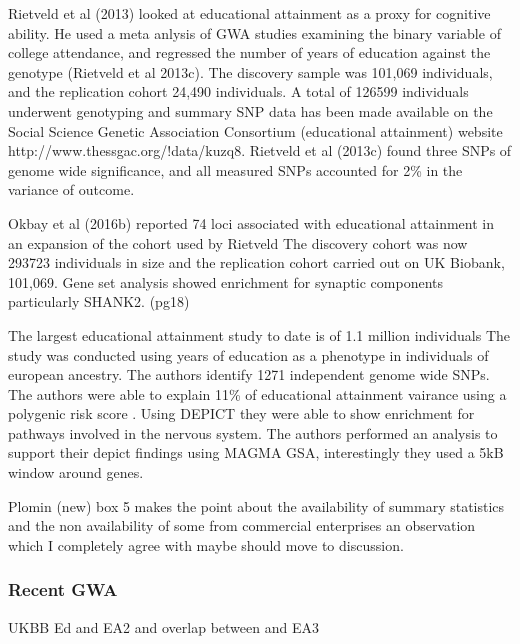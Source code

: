 Rietveld et al (2013) \cite{rietveld2013gwas} looked at educational attainment as a proxy for cognitive ability. He used a meta anlysis of GWA studies examining the binary variable of college attendance, and regressed the number of years of education against the genotype (Rietveld et al 2013c). The discovery sample was 101,069 individuals, and the replication cohort 24,490 individuals. A total of 126599 individuals underwent genotyping and summary SNP data has been made available on the Social Science Genetic Association Consortium (educational attainment) website http://www.thessgac.org/!data/kuzq8. Rietveld et al (2013c) found three SNPs of genome wide significance, and all measured SNPs accounted for 2\% in the variance of outcome.\cite{rietveld2013gwas}

Okbay et al \cite{okbay2016genome}(2016b) reported 74 loci associated with educational attainment in an expansion of the cohort used by Rietveld The discovery cohort was now 293723 individuals in size and the replication cohort carried out on UK Biobank, 101,069. Gene set analysis showed enrichment for synaptic components particularly SHANK2. (pg18)

The largest educational attainment study to date is of 1.1 million individuals \cite{lee2018gene} The study was conducted using years of education as a phenotype in individuals of european ancestry. The authors identify 1271 independent genome wide SNPs. The authors were able to explain 11\% of educational attainment vairance using a polygenic risk score \cite{lee2018gene} . Using DEPICT they were able to show enrichment for pathways involved in the nervous system. The authors performed an analysis to support their depict findings using MAGMA GSA, interestingly they used a 5kB window around genes.  

Plomin (new) \cite{plomin2018new} box 5 makes the point about the availability of summary statistics and the non availability of some from commercial enterprises an observation which I completely agree with maybe should move to discussion.

\subsubsection{Recent GWA}
UKBB Ed and EA2 and overlap between and EA3


